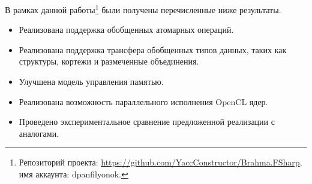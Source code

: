 
В рамках данной работы\footnote{Репозиторий проекта: \url{https://github.com/YaccConstructor/Brahma.FSharp}, имя аккаунта:
dpanfilyonok.} были получены перечисленные ниже результаты.
\begin{itemize}
\item Реализована поддержка обобщенных атомарных операций.
\item Реализована поддержка трансфера обобщенных типов данных, таких как структуры, кортежи и размеченные объединения.
\item Улучшена модель управления памятью.
\item Реализована возможность параллельного исполнения OpenCL ядер.
\item Проведено экспериментальное сравнение предложенной реализации с аналогами. 
\end{itemize}
